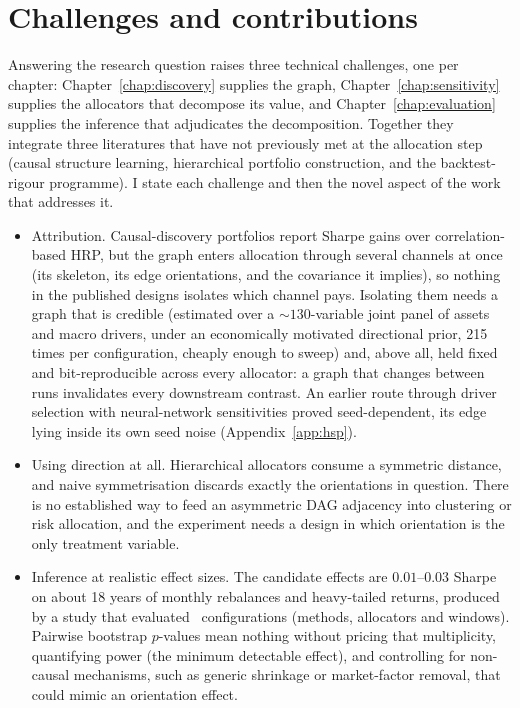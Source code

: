 \section{Challenges and contributions}
\label{sec:challenges}

Answering the research question raises three technical challenges, one per
chapter: Chapter~\ref{chap:discovery} supplies the graph,
Chapter~\ref{chap:sensitivity} supplies the allocators that decompose its
value, and Chapter~\ref{chap:evaluation} supplies the inference that
adjudicates the decomposition. Together they integrate three literatures
that have not previously met at the allocation step (causal structure
learning, hierarchical portfolio construction, and the backtest-rigour
programme). I state each challenge and then the novel aspect of the work
that addresses it.

\begin{itemize}[itemsep=2pt, topsep=3pt]
  \item Attribution. Causal-discovery portfolios report Sharpe
    gains over correlation-based HRP, but the graph enters allocation
    through several channels at once (its skeleton, its edge orientations,
    and the covariance it implies), so nothing in the published designs
    isolates which channel pays. Isolating them needs a graph that is
    credible (estimated over a ${\sim}130$-variable joint panel of assets
    and macro drivers, under an economically motivated directional prior,
    215 times per configuration, cheaply enough to sweep) and, above all,
    held fixed and bit-reproducible across every allocator: a graph that
    changes between runs invalidates every downstream contrast. An earlier
    route through driver selection with neural-network sensitivities
    proved seed-dependent, its edge lying inside its own seed noise
    (Appendix~\ref{app:hsp}).
  \item Using direction at all. Hierarchical allocators consume a
    symmetric distance, and naive symmetrisation discards exactly the
    orientations in question. There is no established way to feed an
    asymmetric DAG adjacency into clustering or risk allocation, and the
    experiment needs a design in which orientation is the only treatment
    variable.
  \item Inference at realistic effect sizes. The candidate
    effects are $0.01$--$0.03$ Sharpe on about 18 years of monthly
    rebalances and heavy-tailed returns, produced by a study that
    evaluated \rsNtrials\ configurations (methods, allocators and
    windows). Pairwise bootstrap $p$-values mean nothing without pricing
    that multiplicity, quantifying power (the minimum detectable effect),
    and controlling for non-causal mechanisms, such as generic shrinkage
    or market-factor removal, that could mimic an orientation effect.
\end{itemize}

